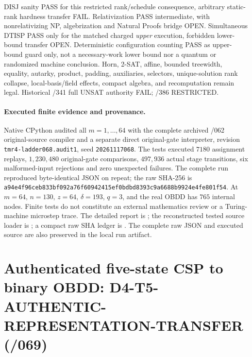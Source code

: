 \documentclass[11pt]{article}
\begin{document}
DISJ sanity PASS for this restricted rank/schedule consequence,
arbitrary static-rank hardness transfer FAIL.
Relativization PASS intermediate, with nonrelativizing NP,
algebrization and Natural Proofs bridge OPEN.
Simultaneous DTISP PASS only for the matched charged
\emph{upper} execution, forbidden lower-bound transfer OPEN.
Deterministic configuration counting PASS as upper-bound
guard only, not a necessary-work lower bound nor a quantum
or randomized machine conclusion.
Horn, 2-SAT, affine, bounded treewidth, equality, autarky,
product, padding, auxiliaries, selectors, unique-solution
rank collapse, local-basis/field effects, compact algebra,
and recomputation remain legal.
Historical /341 full UNSAT authority FAIL; /386 RESTRICTED.

\paragraph{Executed finite evidence and provenance.}
Native CPython audited all $m=1,\ldots,64$ with the
complete archived /062 original-source compiler and a
separate direct original-gate interpreter,
revision \texttt{tmr4-ladder068.audit1},
seed \texttt{20261117068}. The tests executed
$7180$ assignment replays,
$1{,}230{,}480$ original-gate comparisons,
$497{,}936$ actual stage transitions,
six malformed-input rejections and zero unexpected failures.
The complete run reproduced byte-identical JSON on repeat;
the raw SHA-256 is
\texttt{a94e4f96ceb833bf092a76f60942415ef0bdbd8393c9a6688b9924e4fe801f54}.
At $m=64$, $n=130$, $z=64$, $\delta=193$, $q=3$,
and the real OBDD has $765$ internal nodes.
Finite tests do not constitute an external mathematics
review or a Turing-machine microstep trace.
The detailed report is
;
the reconstructed tested source loader is
;
a compact raw SHA ledger is
.
The complete raw JSON and executed source are also
preserved in the local run artifact.


\section{Authenticated five-state CSP to binary OBDD: D4-T5-AUTHENTIC-REPRESENTATION-TRANSFER (/069)}
\end{document}
